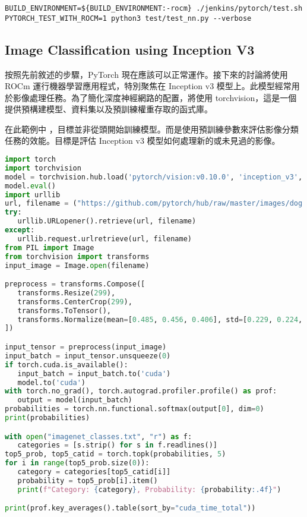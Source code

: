 \begin{lstlisting}[numbers=none, caption={驗證PyTorch的指令}, captionpos=t, label={lst:cmd_pytorch_validation}]
BUILD_ENVIRONMENT=${BUILD_ENVIRONMENT:-rocm} ./jenkins/pytorch/test.sh
PYTORCH_TEST_WITH_ROCM=1 python3 test/test_nn.py --verbose
\end{lstlisting}

\subsection{Image Classification using Inception V3}

按照先前敘述的步驟，PyTorch 現在應該可以正常運作。接下來的討論將使用 ROCm 運行機器學習應用程式，特別聚焦在 Inception v3 模型上。此模型經常用於影像處理任務。為了簡化深度神經網路的配置，將使用 torchvision，這是一個提供預構建模型、資料集以及預訓練權重存取的函式庫。

在此範例中 ，目標並非從頭開始訓練模型。而是使用預訓練參數來評估影像分類任務的效能。目標是評估 Inception v3 模型如何處理新的或未見過的影像。

\begin{lstlisting}[language=python, caption={使用Inception V3進行影像分類}, captionpos=t, label={lst:image_classification_v3}]
import torch
import torchvision
model = torchvision.hub.load('pytorch/vision:v0.10.0', 'inception_v3', pretrained=True)
model.eval()
import urllib
url, filename = ("https://github.com/pytorch/hub/raw/master/images/dog.jpg", "dog.jpg") 
try:
   urllib.URLopener().retrieve(url, filename)
except:
   urllib.request.urlretrieve(url, filename)
from PIL import Image
from torchvision import transforms
input_image = Image.open(filename)

preprocess = transforms.Compose([
   transforms.Resize(299),
   transforms.CenterCrop(299),
   transforms.ToTensor(),
   transforms.Normalize(mean=[0.485, 0.456, 0.406], std=[0.229, 0.224, 0.225]),
])

input_tensor = preprocess(input_image)
input_batch = input_tensor.unsqueeze(0)
if torch.cuda.is_available():
   input_batch = input_batch.to('cuda')
   model.to('cuda')
with torch.no_grad(), torch.autograd.profiler.profile() as prof:
   output = model(input_batch) 
probabilities = torch.nn.functional.softmax(output[0], dim=0)
print(probabilities)

with open("imagenet_classes.txt", "r") as f:
   categories = [s.strip() for s in f.readlines()]
top5_prob, top5_catid = torch.topk(probabilities, 5)
for i in range(top5_prob.size(0)):
   category = categories[top5_catid[i]]
   probability = top5_prob[i].item()
   print(f"Category: {category}, Probability: {probability:.4f}")

print(prof.key_averages().table(sort_by="cuda_time_total"))
\end{lstlisting}

